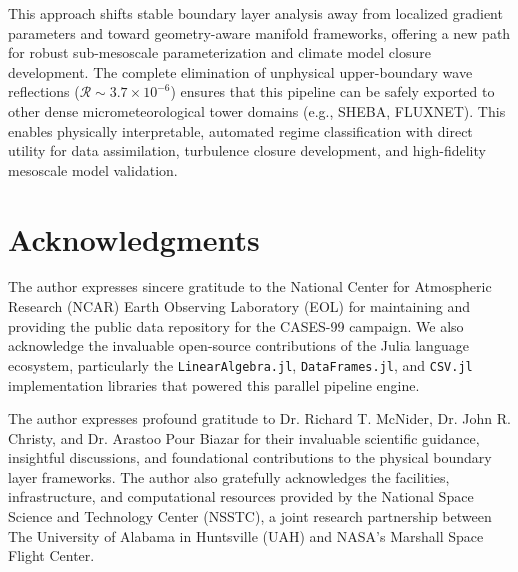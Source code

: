 \documentclass[11pt,a4paper]{article}
\begin{document}
This approach shifts stable boundary layer analysis away from localized gradient parameters and toward geometry-aware manifold frameworks, offering a new path for robust sub-mesoscale parameterization and climate model closure development. The complete elimination of unphysical upper-boundary wave reflections ($\mathcal{R} \sim 3.7 \times 10^{-6}$) ensures that this pipeline can be safely exported to other dense micrometeorological tower domains (e.g., SHEBA, FLUXNET). This enables physically interpretable, automated regime classification with direct utility for data assimilation, turbulence closure development, and high-fidelity mesoscale model validation.

 
\newpage
\section*{Acknowledgments}
The author expresses sincere gratitude to the National Center for Atmospheric Research (NCAR) Earth Observing Laboratory (EOL) for maintaining and providing the public data repository for the CASES-99 campaign. We also acknowledge the invaluable open-source contributions of the Julia language ecosystem, particularly the \texttt{LinearAlgebra.jl}, \texttt{DataFrames.jl}, and \texttt{CSV.jl} implementation libraries that powered this parallel pipeline engine.

The author expresses profound gratitude to Dr. Richard T. McNider, Dr. John R. Christy, and Dr. Arastoo Pour Biazar for their invaluable scientific guidance, insightful discussions, and foundational contributions to the physical boundary layer frameworks. The author also gratefully acknowledges the facilities, infrastructure, and computational resources provided by the National Space Science and Technology Center (NSSTC), a joint research partnership between The University of Alabama in Huntsville (UAH) and NASA's Marshall Space Flight Center.



\end{document}
